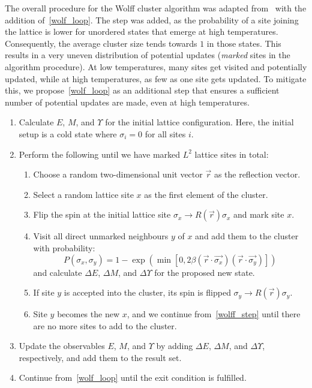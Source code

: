 		The overall procedure for the Wolff cluster algorithm was adapted from~\citet[p. 361]{wolff} with the addition of~\cref{wolf_loop}. The step was added, as the probability of a site joining the lattice is lower for unordered states that emerge at high temperatures. Consequently, the average cluster size tends towards $1$ in those states. This results in a very uneven distribution of potential updates (\emph{marked} sites in the algorithm procedure). At low temperatures, many sites get visited and potentially updated, while at high temperatures, as few as one site gets updated. To mitigate this, we propose~\cref{wolf_loop} as an additional step that ensures a sufficient number of potential updates are made, even at high temperatures.
		\begin{enumerate}
			\item Calculate $E$, $M$, and $\Upsilon$ for the initial lattice configuration. Here, the initial setup is a cold state where $\sigma_i = 0$ for all sites $i$.
			\item \label{wolf_loop} Perform the following until we have marked $L^2$ lattice sites in total:
			\begin{enumerate}
				\item Choose a random two-dimensional unit vector $\vec{r}$ as the reflection vector.
				\item Select a random lattice site $x$ as the first element of the cluster.
				\item Flip the spin at the initial lattice site $\sigma_x \rightarrow R(\vec{r}) \sigma_x$ and mark site $x$.
				\item \label{wolff_step} Visit all direct unmarked neighbours $y$ of $x$ and add them to the cluster with probability:
					\begin{equation}\label{eq:wolff}
						P(\sigma_x, \sigma_y) = 1 - \exp(\min[0, 2 \beta (\vec{r}\cdot\vec{\sigma_x}) (\vec{r}\cdot\vec{\sigma_y})])
					\end{equation}
					and calculate $\Delta E$, $\Delta M$, and $\Delta \Upsilon$ for the proposed new state.
				\item If site $y$ is accepted into the cluster, its spin is flipped $\sigma_y \rightarrow R(\vec{r}) \sigma_y$.
				\item Site $y$ becomes the new $x$, and we continue from~\cref{wolff_step} until there are no more sites to add to the cluster.
			\end{enumerate}
			\item Update the observables $E$, $M$, and $\Upsilon$ by adding $\Delta E$, $\Delta M$, and $\Delta \Upsilon$, respectively, and add them to the result set.
			\item Continue from~\cref{wolf_loop} until the exit condition is fulfilled.
		\end{enumerate}
		

